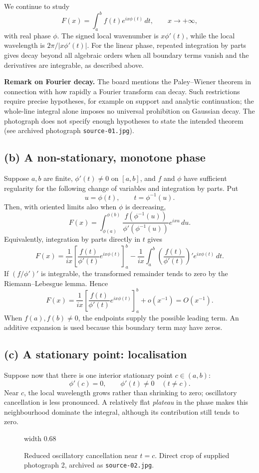 \documentclass[11pt,a4paper]{article}
\begin{document}
We continue to study
\[
    F(x)=\int_a^b f(t)e^{ix\phi(t)}\,dt,\qquad x\to+\infty,
\]
with real phase $\phi$. The signed local wavenumber is $x\phi'(t)$,
while the local wavelength is $2\pi/|x\phi'(t)|$.
For the linear phase, repeated integration by parts gives decay beyond
all algebraic orders when all boundary terms vanish and the derivatives
are integrable, as described above.

\medskip
\noindent\textbf{Remark on Fourier decay.}
The board mentions the Paley--Wiener theorem in connection with how
rapidly a Fourier transform can decay. Such restrictions require precise
hypotheses, for example on support and analytic continuation; the
whole-line integral alone imposes no universal prohibition on Gaussian
decay. The photograph does not specify enough hypotheses to state the
intended theorem (see archived photograph \texttt{source-01.jpg}).

\subsection*{(b) A non-stationary, monotone phase}
Suppose $a,b$ are finite, $\phi'(t)\neq0$ on $[a,b]$, and $f$ and
$\phi$ have sufficient regularity for the following change of variables
and integration by parts. Put
\[
    u=\phi(t),\qquad t=\phi^{-1}(u).
\]
Then, with oriented limits also when $\phi$ is decreasing,
\[
    F(x)=\int_{\phi(a)}^{\phi(b)}
    \frac{f(\phi^{-1}(u))}{\phi'(\phi^{-1}(u))}e^{ixu}\,du.
\]
Equivalently, integration by parts directly in $t$ gives
\[
    F(x)=\frac1{ix}\left[\frac{f(t)}{\phi'(t)}e^{ix\phi(t)}\right]_a^b
    -\frac1{ix}\int_a^b\left(\frac{f(t)}{\phi'(t)}\right)'
    e^{ix\phi(t)}\,dt.
\]
If $(f/\phi')'$ is integrable, the transformed remainder tends to zero
by the Riemann--Lebesgue lemma. Hence
\[
    \boxed{F(x)=\frac1{ix}
    \left[\frac{f(t)}{\phi'(t)}e^{ix\phi(t)}\right]_a^b
    +o(x^{-1})=O(x^{-1}).}
\]
When $f(a),f(b)\neq0$, the endpoints supply the possible leading term.
An additive expansion is used because this boundary term may have zeros.

\subsection*{(c) A stationary point: localisation}
Suppose now that there is one interior stationary point $c\in(a,b)$:
\[
    \phi'(c)=0,\qquad \phi'(t)\neq0\quad(t\neq c).
\]
Near $c$, the local wavelength grows rather than shrinking to zero;
oscillatory cancellation is less pronounced. A relatively flat
\emph{plateau} in the phase makes this neighbourhood dominate the
integral, although its contribution still tends to zero.
\begin{figure}[htbp]
    \centering
    \pdfximage width 0.68\linewidth {figures/asymptotic-lecture8/stationary-phase.jpg}
    \pdfrefximage\pdflastximage
    \caption{Reduced oscillatory cancellation near $t=c$. Direct crop
    of supplied photograph 2, archived as \texttt{source-02.jpg}.}
    \label{fig:am-lecture8-plateau}
\end{figure}
\end{document}
